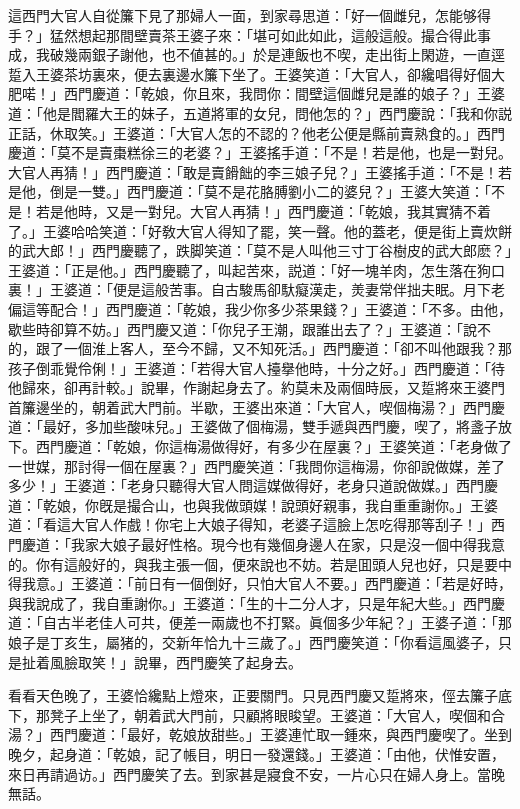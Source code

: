 這西門大官人自從簾下見了那婦人一面，到家尋思道：「好一個雌兒，怎能够得手？」猛然想起那間壁賣茶王婆子來：「堪可如此如此，這般這般。撮合得此事成，我破幾兩銀子謝他，也不値甚的。」於是連飯也不喫，走出街上閑遊，一直逕踅入王婆茶坊裏來，便去裏邊水簾下坐了。王婆笑道：「大官人，卻纔唱得好個大肥喏！」西門慶道：「乾娘，你且來，我問你：間壁這個雌兒是誰的娘子？」王婆道：「他是閻羅大王的妹子，五道將軍的女兒，問他怎的？」西門慶說：「我和你説正話，休取笑。」王婆道：「大官人怎的不認的？他老公便是縣前賣熟食的。」西門慶道：「莫不是賣棗糕徐三的老婆？」王婆搖手道：「不是！若是他，也是一對兒。大官人再猜！」西門慶道：「敢是賣餶飿的李三娘子兒？」王婆搖手道：「不是！若是他，倒是一雙。」西門慶道：「莫不是花胳膊劉小二的婆兒？」王婆大笑道：「不是！若是他時，又是一對兒。大官人再猜！」西門慶道：「乾娘，我其實猜不着了。」王婆哈哈笑道：「好敎大官人得知了罷，笑一聲。他的蓋老，便是街上賣炊餅的武大郎！」西門慶聽了，跌脚笑道：「莫不是人叫他三寸丁谷樹皮的武大郎麽？」王婆道：「正是他。」西門慶聽了，叫起苦來，説道：「好一塊羊肉，怎生落在狗口裏！」王婆道：「便是這般苦事。自古駿馬卻馱癡漢走，羙妻常伴拙夫眠。月下老偏這等配合！」西門慶道：「乾娘，我少你多少茶果錢？」王婆道：「不多。由他，歇些時卻算不妨。」西門慶又道：「你兒子王潮，跟誰出去了？」王婆道：「說不的，跟了一個淮上客人，至今不歸，又不知死活。」西門慶道：「卻不叫他跟我？那孩子倒乖覺伶俐！」王婆道：「若得大官人擡擧他時，十分之好。」西門慶道：「待他歸來，卻再計較。」說畢，作謝起身去了。約莫未及兩個時辰，又踅將來王婆門首簾邊坐的，朝着武大門前。半歇，王婆出來道：「大官人，喫個梅湯？」西門慶道：「最好，多加些酸味兒。」王婆做了個梅湯，雙手遞與西門慶，喫了，將盞子放下。西門慶道：「乾娘，你這梅湯做得好，有多少在屋裏？」王婆笑道：「老身做了一世媒，那討得一個在屋裏？」西門慶笑道：「我問你這梅湯，你卻說做媒，差了多少！」王婆道：「老身只聽得大官人問這媒做得好，老身只道說做媒。」西門慶道：「乾娘，你旣是撮合山，也與我做頭媒！說頭好親事，我自重重謝你。」王婆道：「看這大官人作戲！你宅上大娘子得知，老婆子這臉上怎吃得那等刮子！」西門慶道：「我家大娘子最好性格。現今也有幾個身邊人在家，只是沒一個中得我意的。你有這般好的，與我主張一個，便來說也不妨。若是囬頭人兒也好，只是要中得我意。」王婆道：「前日有一個倒好，只怕大官人不要。」西門慶道：「若是好時，與我說成了，我自重謝你。」王婆道：「生的十二分人才，只是年紀大些。」西門慶道：「自古半老佳人可共，便差一兩歲也不打緊。眞個多少年紀？」王婆子道：「那娘子是丁亥生，屬猪的，交新年恰九十三歲了。」西門慶笑道：「你看這風婆子，只是扯着風臉取笑！」說畢，西門慶笑了起身去。

看看天色晚了，王婆恰纔點上燈來，正要關門。只見西門慶又踅將來，俓去簾子底下，那凳子上坐了，朝着武大門前，只顧將眼睃望。王婆道：「大官人，喫個和合湯？」西門慶道：「最好，乾娘放甜些。」王婆連忙取一鍾來，與西門慶喫了。坐到晚夕，起身道：「乾娘，記了帳目，明日一發還錢。」王婆道：「由他，伏惟安置，來日再請過访。」西門慶笑了去。到家甚是寢食不安，一片心只在婦人身上。當晚無話。

